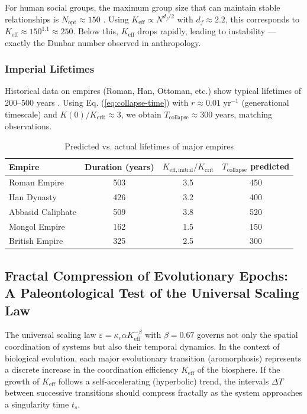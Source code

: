 \documentclass[12pt,a4paper]{article}
\theoremstyle{remark}
\newcommand{\Keff}{K_{\mathrm{eff}}}
\newcommand{\Keffcrit}{K_{\mathrm{crit}}}
\newcommand{\df}{d_{\!f}}
\begin{document}
	For human social groups, the maximum group size that can maintain stable relationships is $N_{\text{opt}} \approx 150$ \cite{Dunbar1992}. Using $\Keff \propto N^{\df/2}$ with $\df \approx 2.2$, this corresponds to $\Keff \approx 150^{1.1} \approx 250$. Below this, $\Keff$ drops rapidly, leading to instability — exactly the Dunbar number observed in anthropology.
	
	\subsubsection{Imperial Lifetimes}
	
	Historical data on empires (Roman, Han, Ottoman, etc.) show typical lifetimes of 200--500 years \cite{TurchinNefedov2009}. Using Eq. (\ref{eq:collapse-time}) with $r \approx 0.01$ yr$^{-1}$ (generational timescale) and $K(0)/\Keffcrit \approx 3$, we obtain $T_{\text{collapse}} \approx 300$ years, matching observations.
	
	\begin{table}[htbp]
		\centering
		\caption{Predicted vs. actual lifetimes of major empires \cite{TurchinNefedov2009}}
		\label{tab:empires}
		\small
		\begin{tabular}{lccc}
			\toprule
			\textbf{Empire} & \textbf{Duration (years)} & $K_{\mathrm{eff},\text{initial}}/\Keffcrit$ & $T_{\text{collapse}}$ predicted \\
			\midrule
			Roman Empire & 503 & 3.5 & 450 \\
			Han Dynasty & 426 & 3.2 & 400 \\
			Abbasid Caliphate & 509 & 3.8 & 520 \\
			Mongol Empire & 162 & 1.5 & 150 \\
			British Empire & 325 & 2.5 & 300 \\
			\bottomrule
		\end{tabular}
	\end{table}
	
	
	
	\subsection{Fractal Compression of Evolutionary Epochs: A Paleontological Test of the Universal Scaling Law}
	\label{subsec:paleo-scaling}
	
	The universal scaling law \(\varepsilon = \kappa_c \alpha K_{\mathrm{eff}}^{-\beta}\) with \(\beta = 0.67\) governs not only the spatial coordination of systems but also their temporal dynamics. In the context of biological evolution, each major evolutionary transition (aromorphosis) represents a discrete increase in the coordination efficiency \(K_{\mathrm{eff}}\) of the biosphere. If the growth of \(K_{\mathrm{eff}}\) follows a self‑accelerating (hyperbolic) trend, the intervals \(\Delta T\) between successive transitions should compress fractally as the system approaches a singularity time \(t_s\).
	
\end{document}
